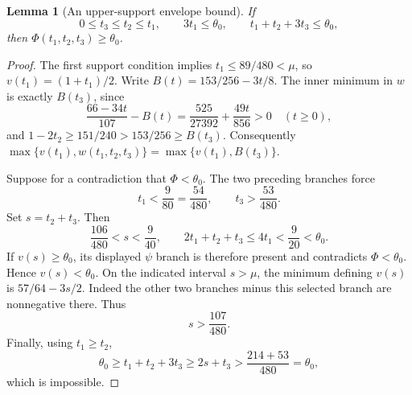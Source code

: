 \documentclass[11pt]{article}
\newtheorem{lemma}[theorem]{Lemma}
\begin{document}
\begin{lemma}[An upper-support envelope bound]
\label{lem:upper-support-89}
If
\[
 0\le t_3\le t_2\le t_1,\qquad 3t_1\le\theta_0,
 \qquad t_1+t_2+3t_3\le\theta_0,
\]
then $\Phi(t_1,t_2,t_3)\ge\theta_0$.
\end{lemma}
\begin{proof}
The first support condition implies $t_1\le89/480<\mu$, so
$v(t_1)=(1+t_1)/2$. Write $B(t)=153/256-3t/8$.
The inner minimum in $w$ is exactly $B(t_3)$, since
\[
 \frac{66-34t}{107}-B(t)=\frac{525}{27392}+\frac{49t}{856}>0
 \quad(t\ge0),
\]
and $1-2t_2\ge151/240>153/256\ge B(t_3)$.
Consequently $\max\{v(t_1),w(t_1,t_2,t_3)\}
=\max\{v(t_1),B(t_3)\}$.

Suppose for a contradiction that $\Phi<\theta_0$.
The two preceding branches force
\[
 t_1<\frac9{80}=\frac{54}{480},\qquad
 t_3>\frac{53}{480}.
\]
Set $s=t_2+t_3$. Then
\[
 \frac{106}{480}<s<\frac9{40},\qquad
 2t_1+t_2+t_3\le4t_1<\frac9{20}<\theta_0.
\]
If $v(s)\ge\theta_0$, its displayed $\psi$ branch is therefore
present and contradicts $\Phi<\theta_0$. Hence $v(s)<\theta_0$.
On the indicated interval $s>\mu$, the minimum defining $v(s)$
is $57/64-3s/2$. Indeed the other two branches minus this
selected branch are nonnegative there. Thus
\[
 s>\frac{107}{480}.
\]
Finally, using $t_1\ge t_2$,
\[
 \theta_0\ge t_1+t_2+3t_3\ge2s+t_3
       >\frac{214+53}{480}=\theta_0,
\]
which is impossible.
\end{proof}
\end{document}
